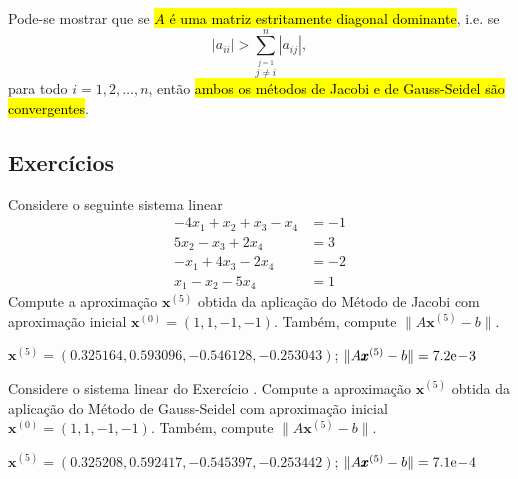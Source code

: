 \begin{obs}{}
  Pode-se mostrar que se \hl{$A$ é uma matriz estritamente diagonal dominante}, i.e. se
  \begin{equation}
    |a_{ii}| > \sum_{\overset{j=1}{j\neq i}}^n |a_{ij}|,
  \end{equation}
para todo $i = 1, 2, \ldots, n$, então \hl{ambos os métodos de Jacobi e de Gauss-Seidel são convergentes}.
\end{obs}

\subsection{Exercícios}

\begin{exer}\label{cap_sislin_sec_jgs:exer:jacobi}
  Considere o seguinte sistema linear
  \begin{align}
    -4x_1 + x_2 + x_3 - x_4 &= -1\\
    5x_2 -x_3 + 2x_4 &= 3\\
    -x_1 + 4x_3 - 2x_4 &= -2\\
    x_1 -x_2 -5x_4 &= 1
  \end{align}
  Compute a aproximação $\pmb{x}^{(5)}$ obtida da aplicação do Método de Jacobi com aproximação inicial $\pmb{x}^{(0)} = (1,  1, -1, -1)$. Também, compute $\|A\pmb{x}^{(5)} - b\|$.
\end{exer}
\begin{resp}
  $\pmb{x}^{(5)} = (0.325164, 0.593096, -0.546128, -0.253043)$; $\|A\pmb{x}^{(5)}-b\| = 7.2\mathrm{e}\!-\!3$
\end{resp}

\begin{exer}
  Considere o sistema linear do Exercício \label{cap_sislin_sec_jgs:exer:jacobi}. Compute a aproximação $\pmb{x}^{(5)}$ obtida da aplicação do Método de Gauss-Seidel com aproximação inicial $\pmb{x}^{(0)} = (1,  1, -1, -1)$. Também, compute $\|A\pmb{x}^{(5)} - b\|$.
\end{exer}
\begin{resp}
  $\pmb{x}^{(5)} = (0.325208, 0.592417, -0.545397, -0.253442)$; $\|A\pmb{x}^{(5)}-b\| = 7.1\mathrm{e}\!-\!4$
\end{resp}

